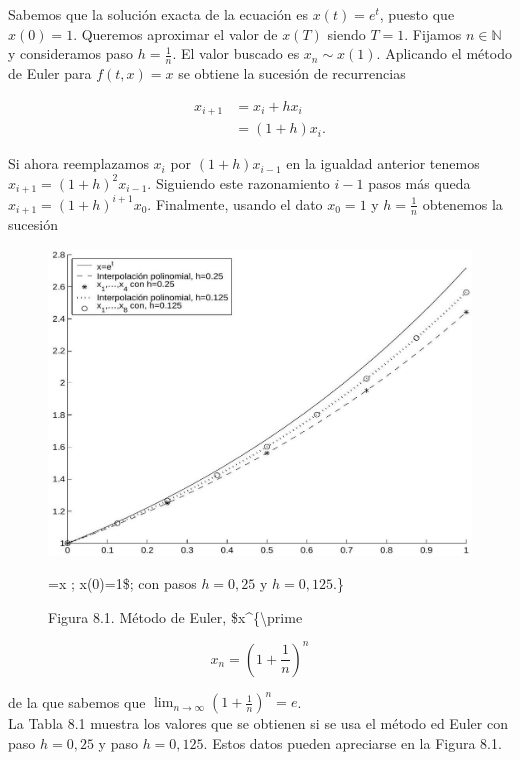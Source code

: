 \documentclass[10pt]{article}
\begin{document}
Sabemos que la solución exacta de la ecuación es $x(t)=e^{t}$, puesto que $x(0)=1$. Queremos aproximar el valor de $x(T)$ siendo $T=1$. Fijamos $n \in \mathbb{N}$ y consideramos paso $h=\frac{1}{n}$. El valor buscado es $x_{n} \sim x(1)$. Aplicando el método de Euler para $f(t, x)=x$ se obtiene la sucesión de recurrencias

$$
\begin{aligned}
x_{i+1} & =x_{i}+h x_{i} \\
& =(1+h) x_{i} .
\end{aligned}
$$

Si ahora reemplazamos $x_{i}$ por $(1+h) x_{i-1}$ en la igualdad anterior tenemos $x_{i+1}=(1+h)^{2} x_{i-1}$. Siguiendo este razonamiento $i-1$ pasos más queda $x_{i+1}=(1+h)^{i+1} x_{0}$. Finalmente, usando el dato $x_{0}=1$ y $h=\frac{1}{n}$ obtenemos la sucesión

\begin{figure}[h]
\begin{center}
  \includegraphics[width=\textwidth]{2025_09_05_3888c9ac96bd653d96b4g-175}
\captionsetup{labelformat=empty}
\caption{Figura 8.1. Método de Euler, \$x\^{}\{\textbackslash prime}=x ; x(0)=1\$; con pasos $h=0,25$ y $h=0,125$.\}\end{center}
\end{figure}

$$
x_{n}=\left(1+\frac{1}{n}\right)^{n}
$$

de la que sabemos que $\lim _{n \rightarrow \infty}\left(1+\frac{1}{n}\right)^{n}=e$.\\
La Tabla 8.1 muestra los valores que se obtienen si se usa el método ed Euler con paso $h=0,25$ y paso $h=0,125$. Estos datos pueden apreciarse en la Figura 8.1.
\end{document}

